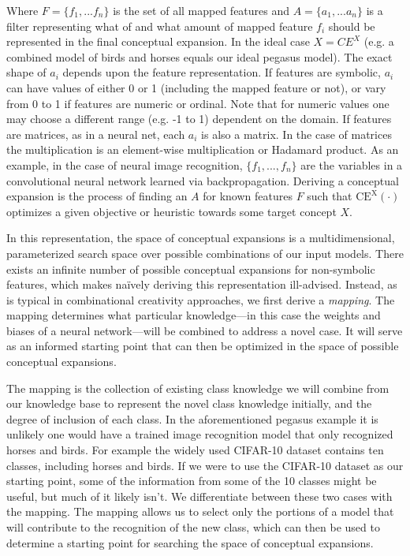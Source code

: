 \documentclass[letterpaper]{article}
\begin{document}
\noindent
Where $F=\{f_1, ...f_n\}$ is the set of all mapped features and $A=\{a_1, ... a_n\}$ is a filter representing what of and what amount of mapped feature $f_i$ should be represented in the final conceptual expansion. 
In the ideal case $X=CE^X$ (e.g. a combined model of birds and horses equals our ideal pegasus model). 
The exact shape of $a_i$ depends upon the feature representation. If features are symbolic, $a_i$ can have values of either 0 or 1 (including the mapped feature or not), or vary from 0 to 1 if features are numeric or ordinal. Note that for numeric values one may choose a different range (e.g. -1 to 1) dependent on the domain. If features are matrices, as in a neural net, each $a_i$ is also a matrix. In the case of matrices the multiplication is an element-wise multiplication or Hadamard product. As an example, in the case of neural image recognition, $\{f_1, ..., f_n\}$ are the variables in a convolutional neural network learned via backpropagation. Deriving a conceptual expansion is the process of finding an $A$ for known features $F$ such that $\mathrm{CE^X}(\cdot)$ optimizes a given objective or heuristic towards some target concept $X$. 

In this representation, the space of conceptual expansions is a multidimensional, parameterized search space over possible combinations of our input models. 
There exists an infinite number of possible conceptual expansions for non-symbolic features, which makes na\"ively deriving this representation ill-advised. 
Instead, as is typical in combinational creativity approaches, we first derive a {\em mapping}. The mapping determines what particular knowledge---in this case the weights and biases of a neural network---will be combined to address a novel case. 
It will serve as an informed starting point that can then be optimized in the space of possible conceptual expansions.

The mapping is the collection of existing class knowledge we will combine from our knowledge base to represent the novel class knowledge initially, and the degree of inclusion of each class. In the aforementioned pegasus example it is unlikely one would have a trained image recognition model that only recognized horses and birds. For example the widely used CIFAR-10 dataset \cite{krizhevsky2009learning} contains ten classes, including horses and birds. If we were to use the CIFAR-10 dataset as our starting point, some of the information from some of the 10 classes might be useful, but much of it likely isn't. We differentiate between these two cases with the mapping. The mapping allows us to select only the portions of a model that will contribute to the recognition of the new class, which can then be used to determine a starting point for searching the space of conceptual expansions.
\end{document}
